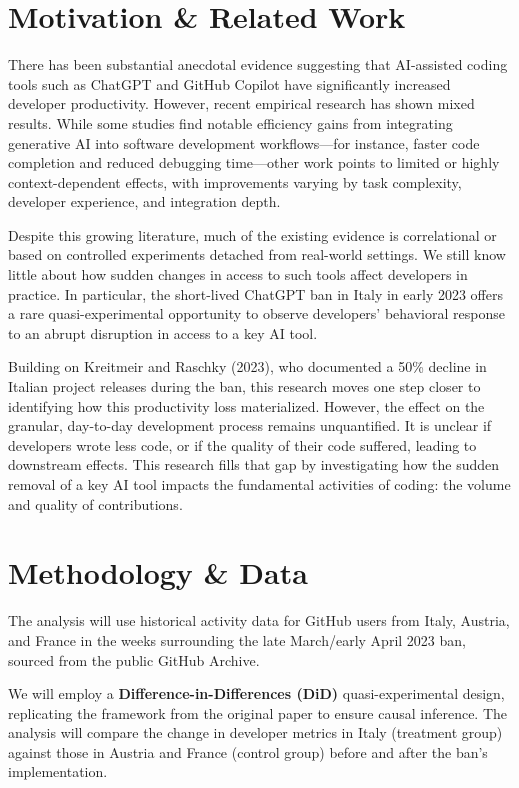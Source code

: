 \section*{Motivation \& Related Work}

There has been substantial anecdotal evidence suggesting that AI-assisted coding tools such as ChatGPT and GitHub Copilot have significantly increased developer productivity. However, recent empirical research has shown mixed results\cite{cui2025the, paradis2024doesaiimpactdevelopment, peng2023impactaideveloperproductivity}. While some studies find notable efficiency gains from integrating generative AI into software development workflows—for instance, faster code completion and reduced debugging time—other work points to limited or highly context-dependent effects, with improvements varying by task complexity, developer experience, and integration depth.

Despite this growing literature, much of the existing evidence is correlational or based on controlled experiments detached from real-world settings. We still know little about how sudden changes in access to such tools affect developers in practice. In particular, the short-lived ChatGPT ban in Italy in early 2023 offers a rare quasi-experimental opportunity to observe developers’ behavioral response to an abrupt disruption in access to a key AI tool.

Building on Kreitmeir and Raschky (2023)\cite{Kreitmeir2023}, who documented a 50\% decline in Italian project releases during the ban, this research moves one step closer to identifying how this productivity loss materialized. However, the effect on the granular, day-to-day development process remains unquantified. It is unclear if developers wrote less code, or if the quality of their code suffered, leading to downstream effects. This research fills that gap by investigating how the sudden removal of a key AI tool impacts the fundamental activities of coding: the volume and quality of contributions.


\section*{Methodology \& Data}

The analysis will use historical activity data for GitHub users from Italy, Austria, and France in the weeks surrounding the late March/early April 2023 ban, sourced from the public GitHub Archive.

We will employ a \textbf{Difference-in-Differences (DiD)} quasi-experimental design, replicating the framework from the original paper to ensure causal inference. The analysis will compare the change in developer metrics in Italy (treatment group) against those in Austria and France (control group) before and after the ban's implementation.

